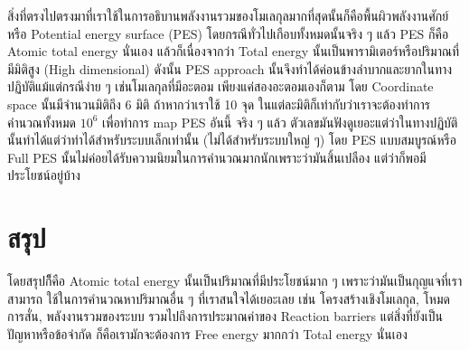 สิ่งที่ตรงไปตรงมาที่เราใช้ในการอธิบานพลังงานรวมของโมเลกุลมากที่สุดนั้นก็คือพื้นผิวพลังงานศักย์หรือ Potential 
energy surface (PES) โดยกรณีทั่วไปเกือบทั้งหมดนั้นจริง ๆ แล้ว PES ก็คือ Atomic total energy 
นั่นเอง แล้วก็เนื่องจากว่า Total energy นั้นเป็นพารามิเตอร์หรือปริมาณที่มีมิติสูง (High dimensional) 
ดังนั้น PES approach นั้นจึงทำได้ค่อนข้างลำบากและยากในทางปฏิบัติแม้แต่กรณีง่าย ๆ เช่นโมเลกุลที่มีอะตอม%
เพียงแค่สองอะตอมเองก็ตาม โดย Coordinate space นั้นมีจำนวนมิติถึง 6 มิติ ถ้าหากว่าเราใช้ 10 จุด%
ในแต่ละมิติก็เท่ากับว่าเราจะต้องทำการคำนวณทั้งหมด $10^{6}$ เพื่อทำการ map PES อันนี้ จริง ๆ แล้ว%
ตัวเลขมันฟังดูเยอะแต่ว่าในทางปฏิบัตินั้นทำได้แต่ว่าทำได้สำหรับระบบเล็กเท่านั้น (ไม่ได้สำหรับระบบใหญ่ ๆ)
โดย PES แบบสมบูรณ์หรือ Full PES นั้นไม่ค่อยได้รับความนิยมในการคำนวณมากนักเพราะว่ามันสิ้นเปลือง%
แต่ว่าก็พอมีประโยชน์อยู่บ้าง

\section{สรุป}

โดยสรุปก็ึคือ Atomic total energy นั้นเป็นปริมาณที่มีประโยชน์มาก ๆ เพราะว่ามันเป็นกุญแจที่เราสามารถ%
ใช้ในการคำนวณหาปริมาณอื่น ๆ ที่เราสนใจได้เยอะเลย เช่น โครงสร้างเชิงโมเลกุล, โหมดการสั่น, 
พลังงานรวมของระบบ รวมไปถึงการประมาณค่าของ Reaction barriers แต่สิ่งที่ยังเป็นปัญหาหรือข้อจำกัด%
ก็คือเรามักจะต้องการ Free energy มากกว่า Total energy นั่นเอง 
